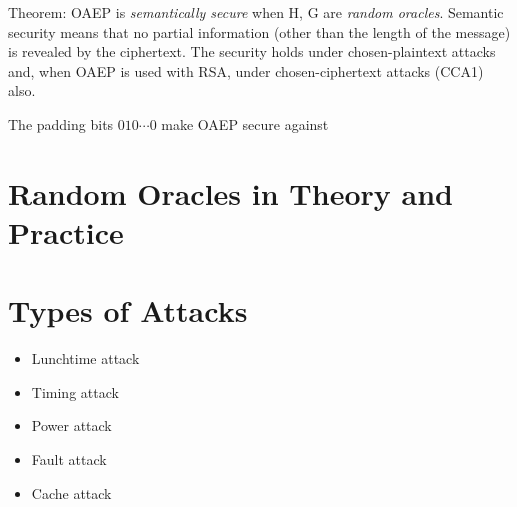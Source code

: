 \documentclass[10pt]{article}
\begin{document}
Theorem: OAEP is \textit{semantically secure} when H, G are \textit{random oracles}. Semantic security means that no partial information (other than the length of the message) is revealed by the ciphertext. The security holds under chosen-plaintext attacks and, when OAEP is used with RSA, under chosen-ciphertext attacks (CCA1) also. 

The padding bits $010\cdots 0$ make OAEP secure against 

\section{Random Oracles in Theory and Practice}

\section{Types of Attacks}

\begin{itemize}
	\item Lunchtime attack
	\item Timing attack
	\item Power attack
	\item Fault attack
	\item Cache attack
\end{itemize}
\end{document}

